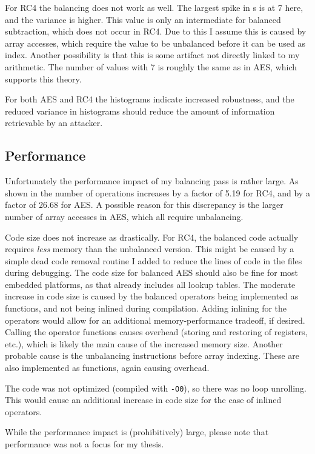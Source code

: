 For RC4 the balancing does not work as well.
The largest spike in \hammingw{}s is at 7 here, and the variance is higher.
This value is only an intermediate \hammingw{} for balanced subtraction, which does not occur in RC4.
Due to this I assume this is caused by array accesses, which require the value to be unbalanced before it can be used as index.
Another possibility is that this is some artifact not directly linked to my arithmetic.
The number of values with \hammingw{} 7 is roughly the same as in AES, which supports this theory.

For both AES and RC4 the histograms indicate increased robustness, and the reduced variance in histograms should reduce the amount of information retrievable by an attacker.

\subsection{Performance}
Unfortunately the performance impact of my balancing pass is rather large.
As shown in  the number of operations increases by a factor of 5.19 for RC4, and by a factor of 26.68 for AES.
A possible reason for this discrepancy is the larger number of array accesses in AES, which all require unbalancing.

Code size does not increase as drastically.
For RC4, the balanced code actually requires \emph{less} memory than the unbalanced version.
This might be caused by a simple dead code removal routine I added to reduce the lines of code in the \ir{} files during debugging.
The code size for balanced AES should also be fine for most embedded platforms, as that already includes all lookup tables.
The moderate increase in code size is caused by the balanced operators being implemented as functions, and not being inlined during compilation.
Adding inlining for the operators would allow for an additional memory-performance tradeoff, if desired.
Calling the operator functions causes overhead (storing and restoring of registers, etc.), which is likely the main cause of the increased memory size.
Another probable cause is the unbalancing instructions before array indexing.
These are also implemented as functions, again causing overhead.

The code was not optimized (compiled with \texttt{-O0}), so there was no loop unrolling.
This would cause an additional increase in code size for the case of inlined operators.

While the performance impact is (prohibitively) large, please note that performance was not a focus for my thesis.
